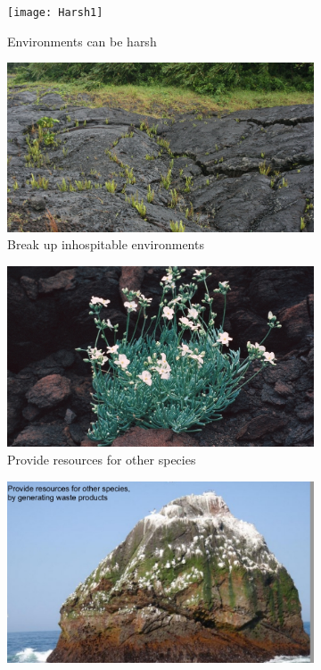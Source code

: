 \documentclass[]{article}
\begin{document}
\begin{figure}[H]
	\centering
	\caption{Living organisms alter their environments}\label{fig:Harsh}
	\begin{subfigure}[b]{0.45\textwidth}
		\centering
		\texttt{[image: Harsh1]}
		\caption{Environments can be harsh}
		\label{fig:Harsh1}
	\end{subfigure}
	\hfill
	\begin{subfigure}[b]{0.45\textwidth}
		\centering
		\includegraphics[width=\textwidth]{Harsh2}
		\caption{Break up inhospitable environments}
		\label{fig:Harsh2}
	\end{subfigure}
	\hfill
	\begin{subfigure}[b]{0.45\textwidth}
		\centering
		\includegraphics[width=\textwidth]{Harsh3}
		\caption{Provide resources for other species}
		\label{fig:Harsh3}
	\end{subfigure}	
	\hfill
	\begin{subfigure}[b]{0.45\textwidth}
		\centering
		\includegraphics[width=\textwidth]{Harsh4}

\end{subfigure}
\end{figure}
\end{document}
